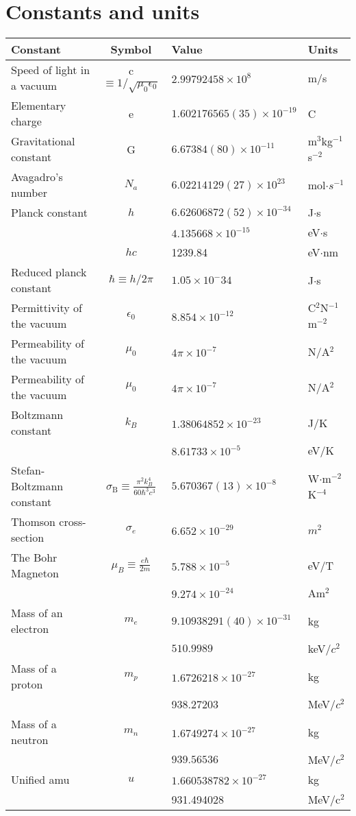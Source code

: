 \chapter{Constants and units}
\thispagestyle{fancy}
\begin{fancybox}{}	
\begin{center}
	\begin{tabular}{   l  |  c  |  l  |  l  }
		Constant & Symbol & Value & Units \\
		\hline
		Speed of light in a vacuum& c $\equiv 1/\sqrt{\mu_0\epsilon_0}$ & $2.99792458 \times 10^8$ & m/s \\
		Elementary charge& e & $1.602176565(35)\times 10^{-19}$ & C\\
		Gravitational constant& G & $6.67384(80)\times 10^{-11}$ & m$^3$kg$^{-1}$s$^{-2}$\\
		Avagadro's number& $N_a$ & $6.02214129(27)\times 10^{23}$ & mol$\cdot s^{-1}$\\
		Planck constant & $h$ & $ 6.62606872(52) \times 10^{-34}$ & J$\cdot$s \\
		& & $4.135668 \times 10^{-15}$ & eV$\cdot$s \\
		& $hc$ & 1239.84 & eV$\cdot$nm \\
		Reduced planck constant& $\hbar \equiv h/2\pi$ & $1.05\times 10^-{34}$ & J$\cdot$s\\
		Permittivity of the vacuum & $\epsilon_0$ & $8.854\times 10^{-12}$ & C$^2$N$^{-1}$m$^{-2}$ \\
		Permeability of the vacuum & $\mu_0$ & $4\pi\times 10^{-7}$ & N/A$^{2}$ \\
		Permeability of the vacuum & $\mu_0$ & $4\pi\times 10^{-7}$ & N/A$^2$ \\
		Boltzmann constant & $k_B$ & $1.38064852\times 10^{-23}$ & J/K \\
				 & & $8.61733\times 10^{-5}$ & eV/K \\
		Stefan-Boltzmann constant & $\sigma_{\textrm{B}} \equiv \frac{\pi^2k_B^4}{60\hbar^3c^3}$ & $5.670367(13)\times 10^{-8}$ & W$\cdot$m$^{-2}$K$^{-4}$ \\
		Thomson cross-section & $\sigma_e$ & $6.652\times10^{-29}$ & $m^2$ \\
		The Bohr Magneton & $\mu_B \equiv \frac{e\hbar}{2m}$ & $5.788\times 10^{-5}$ & eV/T \\
		& & $9.274\times 10^{-24}$ & Am$^2$ \\
		Mass of an electron & $m_e$ & $9.10938291(40)\times 10^{-31}$ & kg\\
		&  & $510.9989$ & keV/$c^2$\\
		Mass of a proton& $m_p$ & $1.6726218 \times 10^{-27}$ & kg\\
		&  & 938.27203 & MeV/$c^2$\\
		Mass of a neutron& $m_n$   & $1.6749274 \times 10^{-27}$ & kg \\
		& & $939.56536$ & MeV/$c^2$	\\
		Unified amu & $u$ &  $1.660538782\times 10^{-27}$ & kg \\
		  &   &  931.494028 & MeV/c$^2$ 
	\end{tabular}
\end{center}
\end{fancybox}

